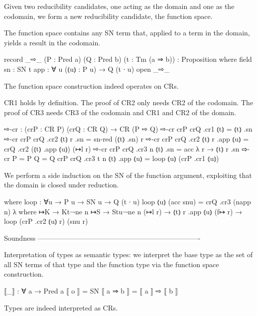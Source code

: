 Given two reducibility candidates, one acting as the domain
and one as the codomain, we form a new reducibility candidate,
the function space.

The function space contains any SN term that, applied to a term
in the domain, yields a result in the codomain.

\begin{code}
record _⇨_ (P : Pred a) (Q : Pred b) (t : Tm (a ⇒ b)) : Proposition where
  field
    sn   : SN t
    app  : ∀ {u} (⦅u⦆ : P u) → Q (t ∙ u)
open _⇨_
\end{code}

The function space construction indeed operates on CRs.

CR1 holds by definition.
The proof of CR2 only needs CR2 of the codomain.
The proof of CR3 needs CR3 of the codomain and CR1 and CR2 of the domain.

\begin{code}
⇨-cr : (crP : CR P) (crQ : CR Q) → CR (P ⇨ Q)
⇨-cr                  crP crQ .cr1 ⦅t⦆                  = ⦅t⦆ .sn
⇨-cr                  crP crQ .cr2 ⦅t⦆ r .sn            = sn-red (⦅t⦆ .sn) r
⇨-cr                  crP crQ .cr2 ⦅t⦆ r .app ⦅u⦆       = crQ .cr2 (⦅t⦆ .app ⦅u⦆) (↦l r)
⇨-cr                  crP crQ .cr3      n ⦅t⦆ .sn       = acc λ r → ⦅t⦆ r .sn
⇨-cr {P = P} {Q = Q}  crP crQ .cr3 {t}  n ⦅t⦆ .app ⦅u⦆  = loop ⦅u⦆ (crP .cr1 ⦅u⦆)
\end{code}

  We perform a side induction on the SN of the function argument,
  exploiting that the domain is closed under reduction.

\begin{code}
  where
  loop : ∀{u} → P u → SN u → Q (t ∙ u)
  loop ⦅u⦆ (acc snu) = crQ .cr3 (napp n) λ where
    ↦K      → Kt¬ne n
    ↦S      → Stu¬ne n
    (↦l r)  → ⦅t⦆ r .app ⦅u⦆
    (f↦ r)  → loop (crP .cr2 ⦅u⦆ r) (snu r)
\end{code}

Soundness
----------------------------------------------------------------------

Interpretation of types as semantic types:
we interpret the base type as the set of all SN terms of that type
and the function type via the function space construction.

\begin{code}
⟦_⟧ : ∀ a → Pred a
⟦ o ⟧      = SN
⟦ a ⇒ b ⟧  = ⟦ a ⟧ ⇨ ⟦ b ⟧
\end{code}

Types are indeed interpreted as CRs.

